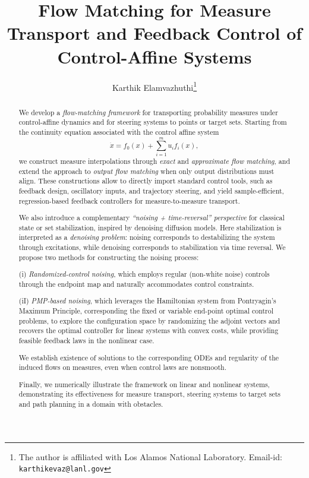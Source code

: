 \documentclass{article}
\title{Flow Matching for Measure Transport and Feedback Control of Control-Affine Systems}
\author{%
  Karthik Elamvazhuthi\thanks{The author is affiliated with Los Alamos National Laboratory. Email-id: \texttt{karthikevaz@lanl.gov}}
}
\begin{document}
\maketitle

 

\begin{abstract}


We develop a \emph{flow-matching framework} for transporting probability measures under control-affine dynamics and for steering systems to points or target sets. Starting from the continuity equation associated with the control affine system
\[
\dot x = f_0(x) + \sum_{i=1}^m u_i f_i(x),
\]
we construct measure interpolations through \emph{exact} and \emph{approximate flow matching}, and extend the approach to \emph{output flow matching} when only output distributions must align. These constructions allow to directly import standard control tools, such as feedback design, oscillatory inputs, and trajectory steering, and yield sample-efficient, regression-based feedback controllers for measure-to-measure transport. 

We also introduce a complementary \emph{``noising + time-reversal'' perspective} for classical state or set stabilization, inspired by denoising diffusion models. Here stabilization is interpreted as a \emph{denoising problem}: noising corresponds to destabilizing the system through excitations, while denoising corresponds to stabilization via time reversal. We propose two methods for constructing the noising process:  

(i) \emph{Randomized-control noising}, which employs regular (non-white noise) controls through the endpoint map and naturally accommodates control constraints.  

(iI) \emph{PMP-based noising}, which leverages the Hamiltonian system from Pontryagin's Maximum Principle, corresponding the fixed or variable end-point optimal control problems, to explore the configuration space by randomizing the adjoint vectors and recovers the optimal controller for linear systems with convex costs, while providing feasible feedback laws in the nonlinear case.  

We establish existence of solutions to the corresponding ODEs and regularity of the induced flows on measures, even when control laws are nonsmooth.

Finally, we numerically illustrate the framework on linear and nonlinear systems, demonstrating its effectiveness for measure transport, steering systems to target sets and path planning in a domain with obstacles.


\end{abstract}
\end{document}
